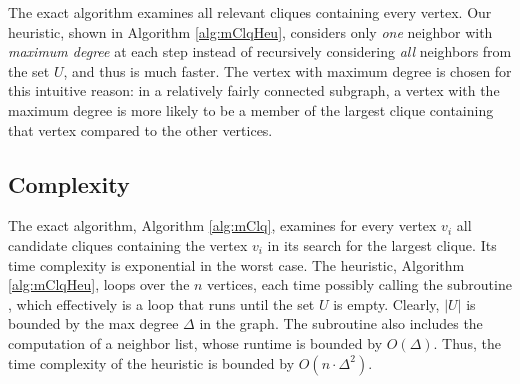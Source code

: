 The exact algorithm examines all relevant cliques containing every vertex.
Our heuristic, shown in Algorithm \ref{alg:mClqHeu}, considers only {\em one} neighbor
with {\em maximum degree} at each step instead of recursively considering {\em all} neighbors 
from the set $U$, and thus is much faster. The vertex with maximum degree is chosen
for this intuitive reason: in a relatively fairly connected subgraph, a vertex with the maximum degree
is more likely to be a member of the largest clique containing that vertex
compared to the other vertices.


\subsection{Complexity}
\label{subsec:complexity}

The exact algorithm, Algorithm \ref{alg:mClq}, examines for every vertex $v_i$ all candidate cliques containing the vertex $v_i$ in its search for the largest clique. Its time complexity is exponential in the worst case. The heuristic, Algorithm \ref{alg:mClqHeu}, loops over the $n$ vertices, each time possibly
calling the subroutine \clqh, which effectively is a loop that runs until the set $U$ is empty. 
Clearly, $|U|$ is bounded by the max degree $\Delta$ in the graph.  
The subroutine also includes the computation of a neighbor list, whose runtime is bounded by 
$O(\Delta)$.
Thus, the time complexity of the heuristic is bounded by $O(n\cdot \Delta^{2})$.

